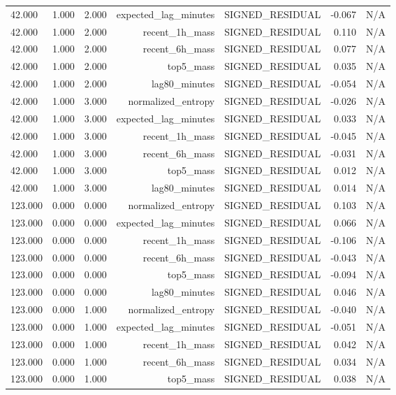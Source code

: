 \begin{table}[h!]
\begin{tabular}{lrrrrrr}
42.000 & 1.000 & 2.000 & expected\_lag\_minutes & SIGNED\_RESIDUAL & -0.067 & N/A \\
42.000 & 1.000 & 2.000 & recent\_1h\_mass & SIGNED\_RESIDUAL & 0.110 & N/A \\
42.000 & 1.000 & 2.000 & recent\_6h\_mass & SIGNED\_RESIDUAL & 0.077 & N/A \\
42.000 & 1.000 & 2.000 & top5\_mass & SIGNED\_RESIDUAL & 0.035 & N/A \\
42.000 & 1.000 & 2.000 & lag80\_minutes & SIGNED\_RESIDUAL & -0.054 & N/A \\
42.000 & 1.000 & 3.000 & normalized\_entropy & SIGNED\_RESIDUAL & -0.026 & N/A \\
42.000 & 1.000 & 3.000 & expected\_lag\_minutes & SIGNED\_RESIDUAL & 0.033 & N/A \\
42.000 & 1.000 & 3.000 & recent\_1h\_mass & SIGNED\_RESIDUAL & -0.045 & N/A \\
42.000 & 1.000 & 3.000 & recent\_6h\_mass & SIGNED\_RESIDUAL & -0.031 & N/A \\
42.000 & 1.000 & 3.000 & top5\_mass & SIGNED\_RESIDUAL & 0.012 & N/A \\
42.000 & 1.000 & 3.000 & lag80\_minutes & SIGNED\_RESIDUAL & 0.014 & N/A \\
123.000 & 0.000 & 0.000 & normalized\_entropy & SIGNED\_RESIDUAL & 0.103 & N/A \\
123.000 & 0.000 & 0.000 & expected\_lag\_minutes & SIGNED\_RESIDUAL & 0.066 & N/A \\
123.000 & 0.000 & 0.000 & recent\_1h\_mass & SIGNED\_RESIDUAL & -0.106 & N/A \\
123.000 & 0.000 & 0.000 & recent\_6h\_mass & SIGNED\_RESIDUAL & -0.043 & N/A \\
123.000 & 0.000 & 0.000 & top5\_mass & SIGNED\_RESIDUAL & -0.094 & N/A \\
123.000 & 0.000 & 0.000 & lag80\_minutes & SIGNED\_RESIDUAL & 0.046 & N/A \\
123.000 & 0.000 & 1.000 & normalized\_entropy & SIGNED\_RESIDUAL & -0.040 & N/A \\
123.000 & 0.000 & 1.000 & expected\_lag\_minutes & SIGNED\_RESIDUAL & -0.051 & N/A \\
123.000 & 0.000 & 1.000 & recent\_1h\_mass & SIGNED\_RESIDUAL & 0.042 & N/A \\
123.000 & 0.000 & 1.000 & recent\_6h\_mass & SIGNED\_RESIDUAL & 0.034 & N/A \\
123.000 & 0.000 & 1.000 & top5\_mass & SIGNED\_RESIDUAL & 0.038 & N/A \\

\end{tabular}
\end{table}

